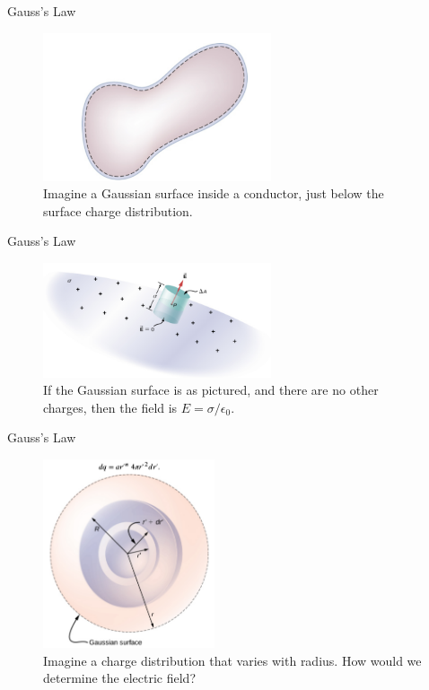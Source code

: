 \documentclass{beamer}
\begin{document}
\begin{frame}{Gauss's Law}
\begin{figure}
\centering
\includegraphics[width=0.6\textwidth]{figures/gaussianConductor.png}
\caption{\label{fig:cond1} Imagine a Gaussian surface inside a conductor, just below the surface charge distribution.}
\end{figure}
\end{frame}

\begin{frame}{Gauss's Law}
\begin{figure}
\centering
\includegraphics[width=0.6\textwidth]{figures/gaussianConductor2.png}
\caption{\label{fig:cond2} If the Gaussian surface is as pictured, and there are no other charges, then the field is $E = \sigma/\epsilon_0$.}
\end{figure}
\end{frame}

\begin{frame}{Gauss's Law}
\begin{figure}
\centering
\includegraphics[width=0.45\textwidth]{figures/charge3D2.png}
\caption{\label{fig:charge3D2} Imagine a charge distribution that varies with radius.  How would we determine the electric field?}
\end{figure}
\end{frame}
\end{document}

